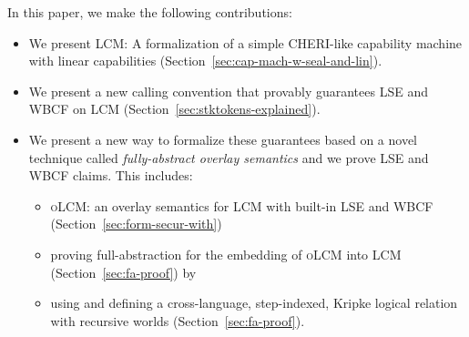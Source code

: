 \documentclass{jfp}
\newcommand{\trgcm}{\textsc{LCM}}
\newcommand{\srccm}{\textsc{oLCM}}
\begin{document}
In this paper, we make the following contributions:
\begin{itemize}
\item We present \trgcm{}: A formalization of a simple CHERI-like capability machine with linear capabilities (Section~\ref{sec:cap-mach-w-seal-and-lin}).
\item We present a new calling convention \stktokens{} that provably guarantees LSE and WBCF on \trgcm{} (Section~\ref{sec:stktokens-explained}).
\item We present a new way to formalize these guarantees based on a novel
  technique called \textit{fully-abstract overlay semantics} and we prove LSE
  and WBCF claims. This includes:
  \begin{itemize}
  \item \srccm{}: an overlay semantics for \trgcm{} with built-in LSE and WBCF (Section~\ref{sec:form-secur-with})
  \item proving full-abstraction for the embedding of \srccm{} into \trgcm{} (Section~\ref{sec:fa-proof}) by
  \item using and defining a cross-language, step-indexed, Kripke logical relation with recursive worlds (Section~\ref{sec:fa-proof}).
  \end{itemize}
\end{itemize}
\end{document}

